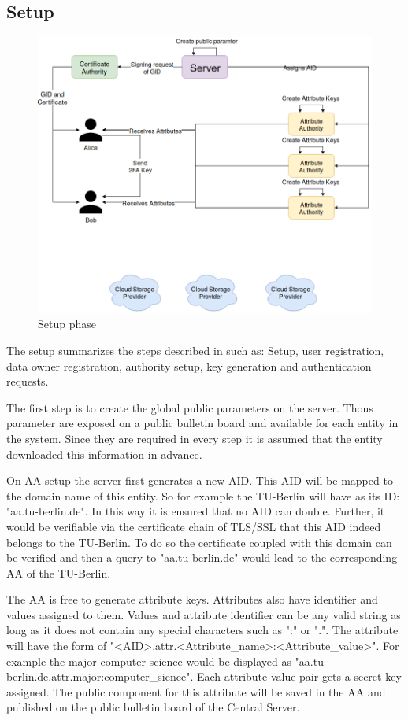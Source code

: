 \subsection{Setup}
\begin{figure}[!ht]
\centering
    \includegraphics[width=\linewidth]{img/TF-DAC-MACS-overview-setup.png}
    \caption{Setup phase}
    \label{fig:tfdacmacs-setup}
\end{figure}

The setup summarizes the steps described in \cite{li2017two} such as: Setup, user registration, data owner registration, authority setup, key generation and authentication requests. 

The first step is to create the global public parameters on the server. Thous parameter are exposed on a public bulletin board and available for each entity in the system. Since they are required in every step it is assumed that the entity downloaded this information in advance. 

On AA setup the server first generates a new AID. This AID will be mapped to the domain name of this entity. So for example the TU-Berlin will have as its ID: "aa.tu-berlin.de". In this way it is ensured that no AID can double. Further, it would be verifiable via the certificate chain of TLS/SSL that this AID indeed belongs to the TU-Berlin. To do so the certificate coupled with this domain can be verified and then a query to "aa.tu-berlin.de" would lead to the corresponding AA of the TU-Berlin.

The AA is free to generate attribute keys. Attributes also have identifier and values assigned to them. Values and attribute identifier can be any valid string as long as it does not contain any special characters such as ":" or ".". The attribute will have the form of "<AID>.attr.<Attribute\_name>:<Attribute\_value>". For example the major computer science would be displayed as "aa.tu-berlin.de.attr.major:computer\_sience". Each attribute-value pair gets a secret key assigned. The public component for this attribute will be saved in the AA and published on the public bulletin board of the Central Server. 


